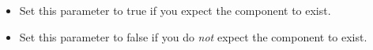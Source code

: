 % 
\begin{itemize}
\item Set this parameter to true if you expect the component to exist.
\item Set this parameter to false if you do \emph{not} expect the component to exist.
\end{itemize}
